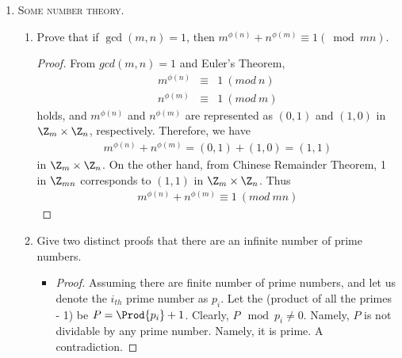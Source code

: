 \documentclass[11pt]{article}
\begin{document}
\begin{enumerate}    
    \item \textsc{Some number theory.}\\
    \begin{enumerate}
        \item {} Prove that if $\gcd(m,n)=1$, then
        $m^{\phi(n)} + n^{\phi(m)} \equiv 1 (\bmod m n)$.
        \begin{proof}
            From $gcd(m,n) = 1$ and Euler's Theorem,
            \begin{eqnarray*}
                m^{\phi(n)} &\equiv& 1\ (mod\ n)\\
                n^{\phi(m)} &\equiv& 1\ (mod\ m)
            \end{eqnarray*}
            holds, and $m^{\phi(n)}$ and $n^{\phi(m)}$ are
            represented as $(0, 1)$ and $(1, 0)$ in
            $\Z_m\times \Z_n$, respectively. Therefore, we
            have
            \begin{eqnarray*}
                m^{\phi(n)} + n^{\phi(m)} = (0, 1) + (1, 0) = (1, 1)
            \end{eqnarray*}
            in $\Z_m\times \Z_n$. On the other hand, from Chinese
            Remainder Theorem, 1 in $\Z_{mn}$ corresponds to $(1, 1)$ in
            $\Z_m\times\Z_n$. Thus 
            \begin{eqnarray*}
                m^{\phi(n)} + n^{\phi(m)} \equiv 1\ (mod\ m n)
            \end{eqnarray*}
        \end{proof}
        \item {} Give two distinct proofs that there
        are an infinite number of prime numbers.
        \begin{itemize}
            \item
            \begin{proof}               
                Assuming there are finite number of
                prime numbers, and let us denote the
                $i_{th}$ prime number as $p_i$. Let
                the (product of all the primes - 1)
                be $P = \Prod{p_i} + 1$. Clearly, $P
                \mod p_i \ne 0$. Namely, $P$ is not
                dividable by any prime number.
                Namely, it is prime. A
                contradiction.
            \end{proof}  
       

\end{itemize}
\end{enumerate}
\end{enumerate}
\end{document}
